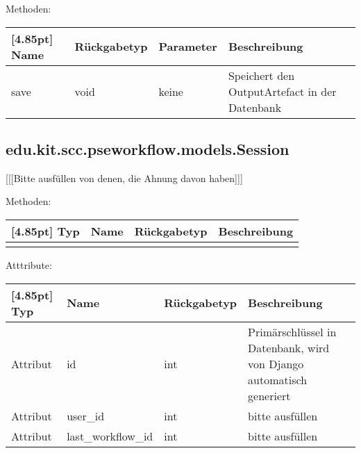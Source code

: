			Methoden:
			\begin{center}
				\setlength\tabcolsep{5pt}
				\renewcommand{\arraystretch}{1.5}
				
				\begin{tabularx}{\textwidth}{|l|l|l|X|}
					\hline
					\rowcolor[gray]{0.75}[4.85pt]
					Name & Rückgabetyp & Parameter & Beschreibung \\ \hline 
				    save & void & keine & Speichert den OutputArtefact in der Datenbank \\
					\hline
				\end{tabularx}
			\end{center}

















		\subsection{edu.kit.scc.pseworkflow.models.Session}
			[[[Bitte ausfüllen von denen, die Ahnung davon haben]]]
			
			Methoden:
			\begin{center}
				\setlength\tabcolsep{5pt}
				\renewcommand{\arraystretch}{1.5}
				
				\begin{tabularx}{\textwidth}{|l|l|l|X|}
					\hline
					\rowcolor[gray]{0.75}[4.85pt]
					Typ & Name & Rückgabetyp & Beschreibung \\ \hline 
					&&& \\
					\hline
				\end{tabularx}
			\end{center}
			
			Atttribute:
			\begin{center}
				\setlength\tabcolsep{5pt}
				\renewcommand{\arraystretch}{1.5}
				
				\begin{tabularx}{\textwidth}{|l|l|l|X|}
					\hline
					\rowcolor[gray]{0.75}[4.85pt]
					Typ & Name & Rückgabetyp & Beschreibung \\ \hline 
					Attribut & id & int & Primärschlüssel in Datenbank, wird von Django automatisch generiert \\ \hline
					Attribut & user\_id & int & bitte ausfüllen \\ \hline
					Attribut & last\_workflow\_id & int & bitte ausfüllen \\
					\hline
				\end{tabularx}
			\end{center}
		
